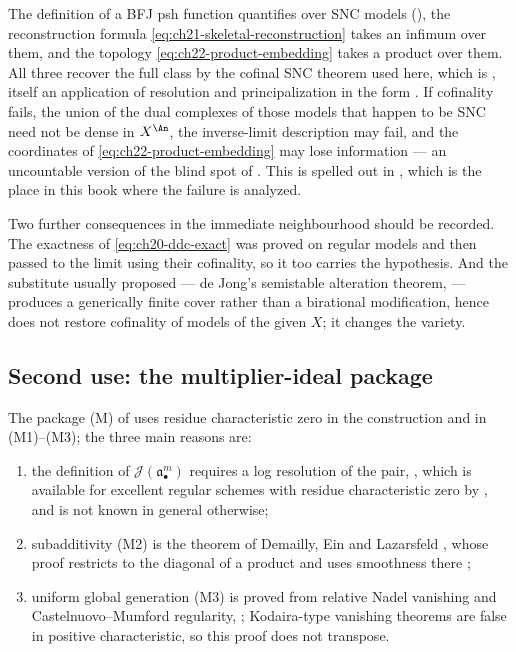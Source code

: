 The definition of a BFJ psh function quantifies over SNC models
(), the reconstruction formula
\eqref{eq:ch21-skeletal-reconstruction} takes an infimum over them, and the
topology \eqref{eq:ch22-product-embedding} takes a product over them.  All
three recover the full class by the cofinal SNC theorem used here,
which is , itself an application of resolution and
principalization in the form .  If cofinality
fails, the union of the dual complexes of those models that happen to be SNC
need not be dense in $X^{\An}$, the inverse-limit description
 may fail, and the coordinates of
\eqref{eq:ch22-product-embedding} may lose information --- an uncountable
version of the blind spot of
.  This is spelled out in
, which is the place in this book where the
failure is analyzed.

Two further consequences in the immediate neighbourhood should be recorded.
The exactness of \eqref{eq:ch20-ddc-exact} was proved on regular models and
then passed to the limit using their cofinality, so it too carries the
hypothesis.  And the substitute usually proposed --- de Jong's semistable
alteration theorem,  --- produces a generically
finite cover rather than a birational modification, hence does not restore
cofinality of models of the given $X$; it changes the variety.

\subsection{Second use: the multiplier-ideal package}

The package \textup{(M)} of  uses residue
characteristic zero in the construction and in (M1)--(M3); the three
main reasons are:

\begin{enumerate}
\item the definition of $\mathcal J(\mathfrak a_\bullet^m)$ requires a log
resolution of the pair, , which is available
for excellent regular schemes with residue characteristic zero by
, and is not known in general otherwise;
\item subadditivity (M2) is the theorem of Demailly, Ein and Lazarsfeld
, whose proof restricts to the
diagonal of a product and uses smoothness there
\cite[Theorem~2.3]{DEL00};
\item uniform global generation (M3) is proved from relative Nadel vanishing
and Castelnuovo--Mumford regularity, ;
Kodaira-type vanishing theorems are false in positive characteristic, so
this proof does not transpose.
\end{enumerate}

